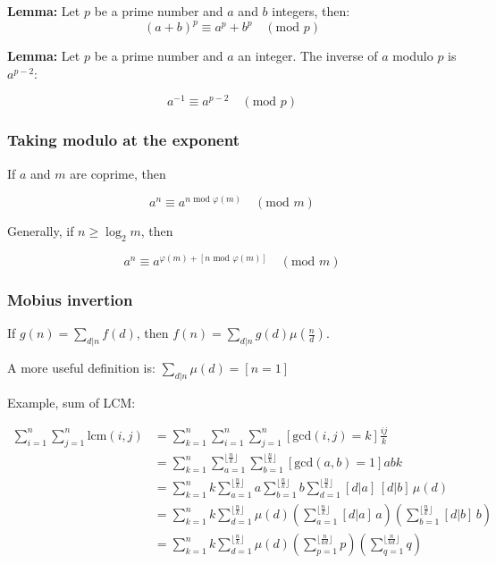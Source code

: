 \textbf{Lemma:} Let $p$ be a prime number and $a$ and $b$ integers, then:
$$(a+b)^{p} \equiv a^{p} + b^{p} \quad (\text{mod } p)$$

\textbf{Lemma:} Let $p$ be a prime number and $a$ an integer. The inverse of $a$ modulo $p$ is $a^{p-2}$:

$$a^{-1} \equiv a^{p-2} \quad (\text{mod } p)$$

\subsubsection{Taking modulo at the exponent}

If $a$ and $m$ are coprime, then

$$ a^n \equiv a^{n \text{ mod } \varphi(m)} \quad (\text{mod } m) $$

Generally, if $n \geq \log_2 m$, then

$$ a^n \equiv a^{\varphi(m) + [n \text{ mod } \varphi(m)]} \quad (\text{mod } m) $$

\subsubsection{Mobius invertion}

If $g(n) = \sum_{d|n} f(d)$, then $f(n) = \sum_{d|n} g(d) \mu(\frac{n}{d})$.

A more useful definition is: $\sum_{d|n} \mu(d) = [n = 1]$

Example, sum of LCM:

\begin{align*}
    \sum_{i = 1}^n \sum_{j = 1}^n \text{lcm}(i, j) &=
    \sum_{k = 1}^n\sum_{i=1}^n\sum_{j=1}^n [\text{gcd}(i, j) = k] \frac{ij}{k} \\
    &= \sum_{k = 1}^n\sum_{a=1}^{\lfloor \frac{n}{k} \rfloor}\sum_{b=1}^{\lfloor \frac{n}{k} \rfloor} [\text{gcd}(a, b) = 1] abk \\
    &= \sum_{k = 1}^n k \sum_{a=1}^{\lfloor \frac{n}{k} \rfloor} a \sum_{b=1}^{\lfloor \frac{n}{k} \rfloor} b \sum_{d=1}^{\lfloor \frac{n}{k} \rfloor}[d|a]\,[d|b] \, \mu(d) \\
    &= \sum_{k = 1}^n k \sum_{d=1}^{\lfloor \frac{n}{k} \rfloor}  \mu(d) \left(\sum_{a=1}^{\lfloor \frac{n}{k} \rfloor} [d|a] \, a\right) \left(\sum_{b=1}^{\lfloor \frac{n}{k} \rfloor} [d|b] \, b\right) \\
    &= \sum_{k = 1}^n k \sum_{d=1}^{\lfloor \frac{n}{k} \rfloor}  \mu(d) \left(\sum_{p=1}^{\lfloor \frac{n}{kd} \rfloor} p\right) \left(\sum_{q=1}^{\lfloor \frac{n}{kd} \rfloor} q\right) \\
\end{align*}


